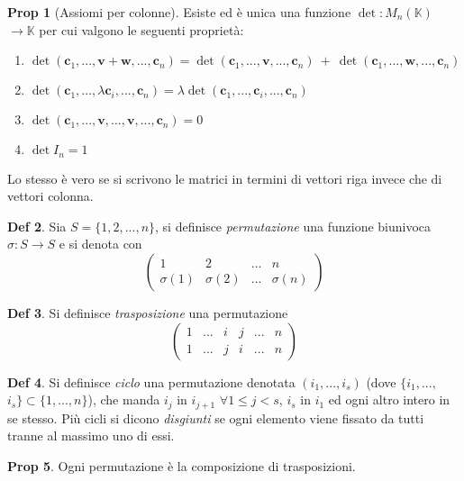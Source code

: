 \documentclass[]{article}
\newcommand{\vv}{\mathbf{v}}
\newcommand{\vw}{\mathbf{w}}
\theoremstyle{definition}
\theoremstyle{definition}
\newtheorem{prop}{Prop}[subsection]
\theoremstyle{definition}
\newtheorem{dfn}[prop]{Def}
\begin{document}
\begin{prop}[Assiomi per colonne] Esiste ed è unica una funzione $\det : M_n (\mathbb{K})$ $\to \mathbb{K}$ per cui valgono le seguenti proprietà:
\begin{enumerate}
\item $\det(\mathbf{c}_1, ... ,\vv +\vw, ... ,\mathbf{c}_n) = \det(\mathbf{c}_1, ... ,\vv , ... ,\mathbf{c}_n)\ +\ \det(\mathbf{c}_1, ... ,\vw, ... ,\mathbf{c}_n)$
\item $\det(\mathbf{c}_1, ... ,\lambda \mathbf{c}_i, ... ,\mathbf{c}_n) = \lambda \det(\mathbf{c}_1, ... , \mathbf{c}_i, ... ,\mathbf{c}_n)$ 
\item $\det(\mathbf{c}_1, ... , \vv, ..., \vv,..., \mathbf{c}_n) = 0$
\item  $\det I_n = 1$
\end{enumerate}

Lo stesso è vero se si scrivono le matrici in termini di vettori riga invece che di vettori colonna.

\end{prop} \begin{dfn} Sia $S = \{ 1,2,...,n\}$, si definisce \emph{permutazione} una funzione biunivoca $\sigma: S \to S$ e si denota con
$$
	\begin{pmatrix}
	1 			& 2 			& ... 	& n			 \\
	\sigma (1) 	& \sigma (2) 	& ... 	& \sigma (n)
	\end{pmatrix} 
$$

\end{dfn} \begin{dfn} Si definisce \emph{trasposizione} una permutazione
$$
	\begin{pmatrix}
	1 	& ... 	& i	& j	& ... 	& n	 \\
	1 	& ... 	& j	& i	& ... 	& n
	\end{pmatrix} 
$$

\end{dfn} \begin{dfn} Si definisce \emph{ciclo} una permutazione denotata  $(i_1,...,i_s)$ (dove $\{i_1,...,$ $i_s\} \subset \{1,...,n\}$), che manda $i_j$ in $i_{j+1}$ $\forall 1 \leq j < s$, $i_s$ in $i_1$ ed ogni altro intero in se stesso. Più cicli si dicono \emph{disgiunti} se ogni elemento viene fissato da tutti tranne al massimo uno di essi.

\end{dfn} \begin{prop} Ogni permutazione è la composizione di trasposizioni.


\end{prop}
\end{document}

